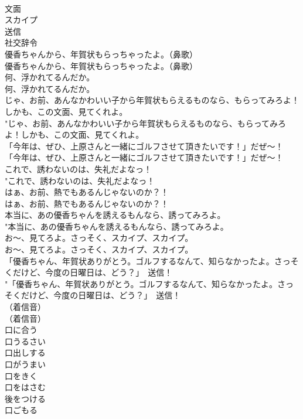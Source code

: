 \documentclass[8pt]{extreport}
\begin{document}
\begin{CJK}{UTF8}{min}
\\	文面
\\	スカイプ
\\	送信
\\	社交辞令
\\	優香ちゃんから、年賀状もらっちゃったよ。（鼻歌）	
\\	優香ちゃんから、年賀状もらっちゃったよ。（鼻歌） 
\\	何、浮かれてるんだか。	
\\	何、浮かれてるんだか。 
\\	じゃ、お前、あんなかわいい子から年賀状もらえるものなら、もらってみろよ！しかも、この文面、見てくれよ。	
\\	"じゃ、お前、あんなかわいい子から年賀状もらえるものなら、もらってみろよ！しかも、この文面、見てくれよ。 
\\	「今年は、ぜひ、上原さんと一緒にゴルフさせて頂きたいです！」だぜ～！	
\\	「今年は、ぜひ、上原さんと一緒にゴルフさせて頂きたいです！」だぜ～！ 
\\	これで、誘わないのは、失礼だよなっ！	
\\	"これで、誘わないのは、失礼だよなっ！ 
\\	はぁ、お前、熱でもあるんじゃないのか？！	
\\	はぁ、お前、熱でもあるんじゃないのか？！ 
\\	本当に、あの優香ちゃんを誘えるもんなら、誘ってみろよ。	
\\	"本当に、あの優香ちゃんを誘えるもんなら、誘ってみろよ。 
\\	お～、見てろよ。さっそく、スカイプ、スカイプ。	
\\	お～、見てろよ。さっそく、スカイプ、スカイプ。 
\\	「優香ちゃん、年賀状ありがとう。ゴルフするなんて、知らなかったよ。さっそくだけど、今度の日曜日は、どう？」　送信！	
\\	"「優香ちゃん、年賀状ありがとう。ゴルフするなんて、知らなかったよ。さっそくだけど、今度の日曜日は、どう？」　送信！ 
\\	（着信音）	
\\	（着信音） 
\\	口に合う
\\	口うるさい
\\	口出しする
\\	口がうまい
\\	口をきく
\\	口をはさむ
\\	後をつける
\\	口ごもる

\end{CJK}
\end{document}
